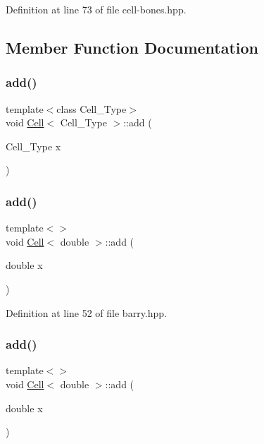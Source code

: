 Definition at line 73 of file cell-\/bones.\+hpp.



\subsection{Member Function Documentation}
\mbox{\label{class_cell_a3d063afd2a8743623d0e524debbd55e9}} 
\subsubsection{\texorpdfstring{add()}{add()}\hspace{0.1cm}{\footnotesize\ttfamily [1/9]}}
{\footnotesize\ttfamily template$<$class Cell\+\_\+\+Type$>$ \\
void \hyperlink{class_cell}{Cell}$<$ Cell\+\_\+\+Type $>$\+::add (\begin{DoxyParamCaption}\item[{Cell\+\_\+\+Type}]{x }\end{DoxyParamCaption})}

\mbox{\label{class_cell_a64d4b92f322ccb8cfbad53f816d2caf8}} 
\subsubsection{\texorpdfstring{add()}{add()}\hspace{0.1cm}{\footnotesize\ttfamily [2/9]}}
{\footnotesize\ttfamily template$<$$>$ \\
void \hyperlink{class_cell}{Cell}$<$ double $>$\+::add (\begin{DoxyParamCaption}\item[{double}]{x }\end{DoxyParamCaption})\hspace{0.3cm}{\ttfamily [inline]}}



Definition at line 52 of file barry.\+hpp.

\mbox{\label{class_cell_a64d4b92f322ccb8cfbad53f816d2caf8}} 
\subsubsection{\texorpdfstring{add()}{add()}\hspace{0.1cm}{\footnotesize\ttfamily [3/9]}}
{\footnotesize\ttfamily template$<$$>$ \\
void \hyperlink{class_cell}{Cell}$<$ double $>$\+::add (\begin{DoxyParamCaption}\item[{double}]{x }\end{DoxyParamCaption})\hspace{0.3cm}{\ttfamily [inline]}}



